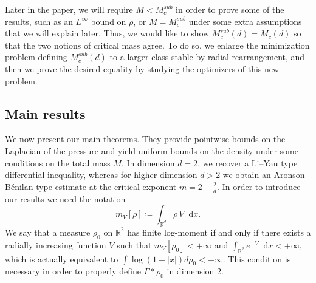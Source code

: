 \documentclass[11pt,a4paper]{article}
\numberwithin{equation}{section}
\newcommand{\R}{{\mathbb{R}}}
\theoremstyle{plain}
\theoremstyle{remark}
\newcommand {\f}{\frac}
\newcommand{\diff}{\mathop{}\!\mathrm{d}}
\begin{document}
Later in the paper, we will require $M < M^{sub}_c$ in order to prove some of the results, such as an $L^\infty$ bound on $\rho$, or $M = M^{sub}_c$ under some extra assumptions that we will explain later. 
Thus, we would like to show $M^{sub}_c(d)=M_c(d)$ so that the two notions of critical mass agree. To do so, we enlarge the minimization problem defining $M^{sub}_c(d)$ to a larger class stable by radial rearrangement, and then we prove the desired equality by studying the optimizers of this new problem.

\subsection{Main results}

We now present our main theorems. They provide pointwise bounds on the Laplacian of the pressure and yield uniform bounds on the density under some conditions on the total mass $M$. In dimension $d=2$, we recover a Li--Yau type differential inequality, whereas for higher dimension $d>2$ we obtain an Aronson--B\'enilan type estimate at the critical exponent $m=2-\f{2}{d}$. In order to introduce our results we need the notation 
$$
m_{V}[\rho]\coloneqq \int_{\R^d}\rho\,V \diff x.
$$
%
We say that a measure $\rho_0$ on $\R^2$ has finite log-moment if and only if there exists a radially increasing function $V$ such that $m_V[\rho_0]<+\infty$ and  $\int_{\R^2}e^{-V}\diff x<+\infty$, which is actually equivalent to $\int \log(1+|x|)d\rho_0<+\infty$. This condition is necessary in order to properly define $\Gamma*\rho_0$ in dimension 2.
\end{document}
